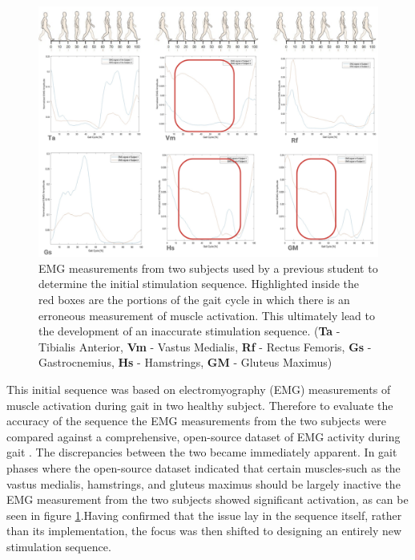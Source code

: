 \begin{figure} [h]
    \centering
    \includegraphics[width=0.99\linewidth]{images/wrongemg.png}

    \caption{EMG measurements from two subjects used by a previous student to determine the initial stimulation sequence. Highlighted inside the red boxes are the portions of the gait cycle in which there is an erroneous measurement of muscle activation. This ultimately lead to the development of an inaccurate stimulation sequence. (\textbf{Ta} - Tibialis Anterior, \textbf{Vm} - Vastus Medialis, \textbf{Rf} - Rectus Femoris, \textbf{Gs} - Gastrocnemius, \textbf{Hs} - Hamstrings, \textbf{GM} - Gluteus Maximus)}
    \label{fig:wrongemg}
\end{figure}

This initial sequence was based on electromyography (EMG) measurements of muscle activation during gait in two healthy subject. Therefore to evaluate the accuracy of the sequence the EMG measurements from the two subjects were compared against a comprehensive, open-source dataset of EMG activity during gait \cite{camargo_comprehensive_2021}. The discrepancies between the two became immediately apparent. In gait phases where the open-source dataset indicated that certain muscles-such as the vastus medialis, hamstrings, and gluteus maximus should be largely inactive the EMG measurement from the two subjects showed significant activation, as can be seen in figure \ref{fig:wrongemg}.Having confirmed that the issue lay in the sequence itself, rather than its implementation, the focus was then shifted to designing an entirely new stimulation sequence.

